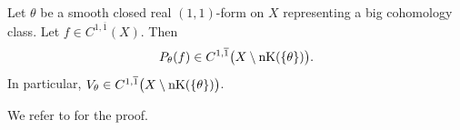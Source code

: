 \begin{theorem}\label{thm:DNT23_C11bar}
Let $\theta$ be a smooth closed real $(1,1)$-form on $X$ representing a big cohomology class. Let $f\in C^{1,\overline{1}}(X)$. Then
\[
P_\theta(f)\in C^{1,\overline{1}}\bigl(X\setminus\operatorname{nK}(\{\theta\})\bigr).
\]
In particular, $V_{\theta}\in C^{1,\overline{1}}\bigl(X\setminus\operatorname{nK}(\{\theta\})\bigr)$.
\end{theorem}

We refer to \cite{DNT23} for the proof.



%
